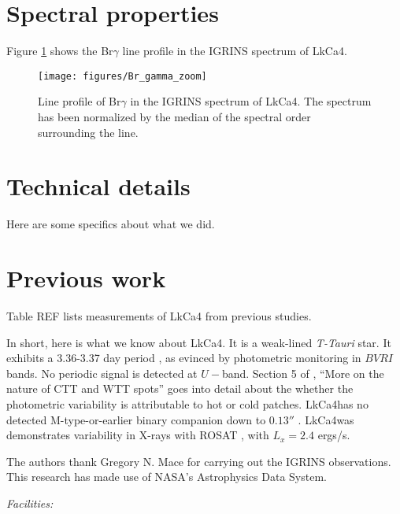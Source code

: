 \documentclass[iop,revtex4]{emulateapj}%
\newcommand{\name}{LkCa4}
\begin{document}
\section{Spectral properties}\label{sec:lines}

Figure \ref{fig:BrG} shows the Br$\gamma$ line profile in the IGRINS spectrum of \name.  

\begin{figure}
	\centering
	\texttt{[image: figures/Br\_gamma\_zoom]} 
	\caption{Line profile of Br$\gamma$ in the IGRINS spectrum of \name.  The spectrum has been normalized by the median of the spectral order surrounding the line.}
	\label{fig:BrG}
\end{figure}


\appendix

\section{Technical details}

Here are some specifics about what we did.

\section{Previous work}

Table REF lists measurements of LkCa4 from previous studies.


In short, here is what we know about \name.  It is a weak-lined \emph{T-Tauri} star.  It exhibits a 3.36-3.37 day period \citep{1993AJ....106.1608V,1994IBVS.4042....1G}, as evinced by photometric monitoring in $BVRI$ bands.  No periodic signal is detected at $U-$band.  Section 5 of \citet{1993AJ....106.1608V}, ``More on the nature of CTT and WTT spots'' goes into detail about the whether the photometric variability is attributable to hot or cold patches.  \name has no detected M-type-or-earlier binary companion down to $0.13''$ \citep{1993A&A...278..129L}.  \name was demonstrates variability in X-rays with ROSAT \citep{1994ApJ...424..237S}, with $L_{x}=2.4$ ergs/s.


\acknowledgements
The authors thank Gregory N. Mace for carrying out the IGRINS observations. This research has made use of NASA's Astrophysics Data System.

{\it Facilities:} 

\clearpage



\end{document}

